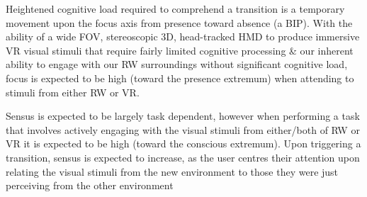 \documentclass[oneside]{book}
\begin{document}
Heightened cognitive load required to comprehend a transition is a temporary movement upon the focus axis from presence toward absence (a BIP). With the ability of a wide FOV, stereoscopic 3D, head-tracked HMD to produce immersive VR visual stimuli that require fairly limited cognitive processing \& our inherent ability to engage with our RW surroundings without significant cognitive load, focus is expected to be high (toward the presence extremum) when attending to stimuli from either RW or VR.

Sensus is expected to be largely task dependent, however when performing a task that involves actively engaging with the visual stimuli from either/both of RW or VR it is expected to be high (toward the conscious extremum). Upon triggering a transition, sensus is expected to increase, as the user centres their attention upon relating the visual stimuli from the new environment to those they were just perceiving from the other environment





\end{document}
